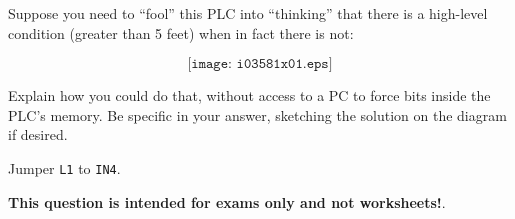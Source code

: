 

Suppose you need to ``fool'' this PLC into ``thinking'' that there is a high-level condition (greater than 5 feet) when in fact there is not:

$$\texttt{[image: i03581x01.eps]}$$

Explain how you could do that, without access to a PC to force bits inside the PLC's memory.  Be specific in your answer, sketching the solution on the diagram if desired.







Jumper {\tt L1} to {\tt IN4}.







{\bf This question is intended for exams only and not worksheets!}.


